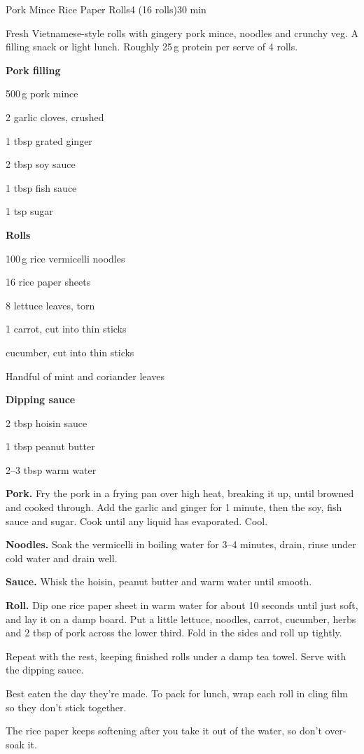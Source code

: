 \begin{recipebox}{Pork Mince Rice Paper Rolls}{4 (16 rolls)}{30 min}

Fresh Vietnamese-style rolls with gingery pork mince, noodles and crunchy veg.
A filling snack or light lunch. Roughly 25\,g protein per serve of 4 rolls.

\begin{ingredients}
  \item[] \textbf{Pork filling}
  \item 500\,g pork mince
  \item 2 garlic cloves, crushed
  \item 1 tbsp grated ginger
  \item 2 tbsp soy sauce
  \item 1 tbsp fish sauce
  \item 1 tsp sugar
  \item[] \textbf{Rolls}
  \item 100\,g rice vermicelli noodles
  \item 16 rice paper sheets
  \item 8 lettuce leaves, torn
  \item 1 carrot, cut into thin sticks
  \item {} cucumber, cut into thin sticks
  \item Handful of mint and coriander leaves
  \item[] \textbf{Dipping sauce}
  \item 2 tbsp hoisin sauce
  \item 1 tbsp peanut butter
  \item 2--3 tbsp warm water
\end{ingredients}

\begin{method}
  \item \textbf{Pork.} Fry the pork in a frying pan over high heat, breaking it up, until browned and cooked through. Add the garlic and ginger for 1 minute, then the soy, fish sauce and sugar. Cook until any liquid has evaporated. Cool.
  \item \textbf{Noodles.} Soak the vermicelli in boiling water for 3--4 minutes, drain, rinse under cold water and drain well.
  \item \textbf{Sauce.} Whisk the hoisin, peanut butter and warm water until smooth.
  \item \textbf{Roll.} Dip one rice paper sheet in warm water for about 10 seconds until just soft, and lay it on a damp board. Put a little lettuce, noodles, carrot, cucumber, herbs and 2 tbsp of pork across the lower third. Fold in the sides and roll up tightly.
  \item Repeat with the rest, keeping finished rolls under a damp tea towel. Serve with the dipping sauce.
\end{method}

\begin{notelist}
  \item Best eaten the day they're made. To pack for lunch, wrap each roll in cling film so they don't stick together.
  \item The rice paper keeps softening after you take it out of the water, so don't over-soak it.
\end{notelist}

\end{recipebox}
